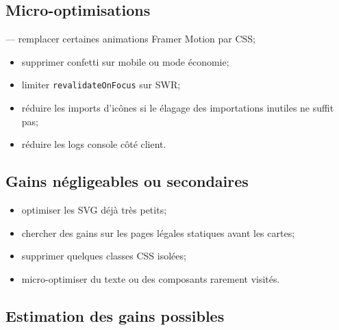 \documentclass[
  10pt,
  a4paper,
  DIV=11,
  numbers=noendperiod,
  oneside]{scrreprt}
\begin{document}
\subsection{Micro-optimisations}\label{micro-optimisations}

--- remplacer certaines animations Framer Motion par CSS;

\begin{itemize}
\item
  supprimer confetti sur mobile ou mode économie;
\item
  limiter \texttt{revalidateOnFocus} sur SWR;
\item
  réduire les imports d'icônes si le élagage des importations inutiles
  ne suffit pas;
\item
  réduire les logs console côté client.
\end{itemize}

\subsection{Gains négligeables ou
secondaires}\label{gains-nuxe9gligeables-ou-secondaires}

\begin{itemize}
\item
  optimiser les SVG déjà très petits;
\item
  chercher des gains sur les pages légales statiques avant les cartes;
\item
  supprimer quelques classes CSS isolées;
\item
  micro-optimiser du texte ou des composants rarement visités.
\end{itemize}

\subsection{Estimation des gains
possibles}\label{estimation-des-gains-possibles-1}
\end{document}
